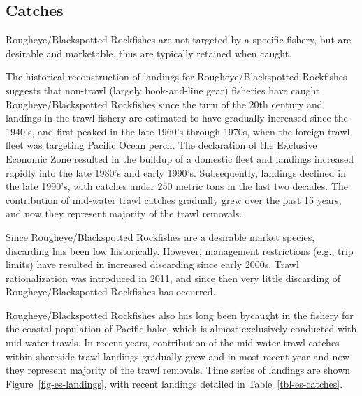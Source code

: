\documentclass[
]{scrartcl}
\begin{document}
\subsection{Catches}\label{catches}

Rougheye/Blackspotted Rockfishes are not targeted by a specific fishery,
but are desirable and marketable, thus are typically retained when
caught.

The historical reconstruction of landings for Rougheye/Blackspotted
Rockfishes suggests that non-trawl (largely hook-and-line gear)
fisheries have caught Rougheye/Blackspotted Rockfishes since the turn of
the 20th century and landings in the trawl fishery are estimated to have
gradually increased since the 1940's, and first peaked in the late
1960's through 1970s, when the foreign trawl fleet was targeting Pacific
Ocean perch. The declaration of the Exclusive Economic Zone resulted in
the buildup of a domestic fleet and landings increased rapidly into the
late 1980's and early 1990's. Subsequently, landings declined in the
late 1990's, with catches under 250 metric tons in the last two decades.
The contribution of mid-water trawl catches gradually grew over the past
15 years, and now they represent majority of the trawl removals.

Since Rougheye/Blackspotted Rockfishes are a desirable market species,
discarding has been low historically. However, management restrictions
(e.g., trip limits) have resulted in increased discarding since early
2000s. Trawl rationalization was introduced in 2011, and since then very
little discarding of Rougheye/Blackspotted Rockfishes has occurred.

Rougheye/Blackspotted Rockfishes also has long been bycaught in the
fishery for the coastal population of Pacific hake, which is almost
exclusively conducted with mid-water trawls. In recent years,
contribution of the mid-water trawl catches within shoreside trawl
landings gradually grew and in most recent year and now they represent
majority of the trawl removals. Time series of landings are shown
Figure~\ref{fig-es-landings}, with recent landings detailed in
Table~\ref{tbl-es-catches}.

\begingroup
\fontsize{7.5pt}{9.0pt}\selectfont
\end{document}
